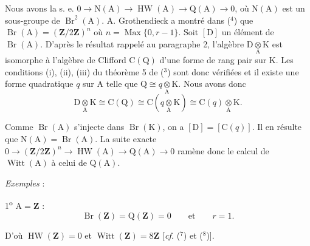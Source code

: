 Nous avons la s. e. $0\to\mathrm N(\mathrm A)\to\operatorname{HW}(\mathrm A)\to\mathrm Q(\mathrm A)\to0$, où $\mathrm N(\mathrm A)$ est un sous-groupe
de $\operatorname{Br}^2(\mathrm A)$. A. Grothendieck a montré dans (${}^4$) que $\operatorname{Br}(\mathrm A)=(\mathbf Z/2\mathbf Z)^n$ où
$n=\operatorname{Max}\{0,r-1\}$. Soit $[\mathrm D]$ un élément de $\operatorname{Br}(\mathrm A)$. D'après le résultat rappelé au
paragraphe 2, l'algèbre $\mathrm D\underset{\mathrm A}{\otimes}\mathrm K$ est isomorphe à l'algèbre de Clifford $\mathrm C(\mathrm Q)$ d'une forme
de rang pair sur K. Les conditions (i), (ii), (iii) du théorème 5 de (${}^3$) sont donc vérifiées
et il existe une forme quadratique $q$ sur A telle que $\mathrm Q\cong q\underset{\mathrm A}{\otimes}\mathrm K$. Nous avons donc
\[
\mathrm D\underset{\mathrm A}{\otimes}\mathrm K\cong\mathrm C(\mathrm Q)\cong\mathrm C(q\underset{\mathrm A}{\otimes}\mathrm K)\cong\mathrm C(q)\underset{\mathrm A}{\otimes}\mathrm K.
\]

Comme $\operatorname{Br}(\mathrm A)$ s'injecte dans $\operatorname{Br}(\mathrm K)$, on a $[\mathrm D]=[\mathrm C(q)]$. Il en résulte que $\mathrm N(\mathrm A)=\operatorname{Br}(\mathrm A)$.
La suite exacte $0\to(\mathbf Z/2\mathbf Z)^n\to\operatorname{HW}(\mathrm A)\to\mathrm Q(\mathrm A)\to0$ ramène donc le calcul de $\operatorname{Witt}(\mathrm A)$
à celui de $\mathrm Q(\mathrm A)$.

\emph{Exemples} :

1\textsuperscript{o} $\mathrm A=\mathbf Z$ :
\[
\operatorname{Br}(\mathbf Z)=\mathrm Q(\mathbf Z)=0\qquad\text{et}\qquad r=1.
\]

D'où $\operatorname{HW}(\mathbf Z)=0$ et $\operatorname{Witt}(\mathbf Z)=8\mathbf Z$ [\emph{cf.} (${}^7$) et (${}^8$)].

